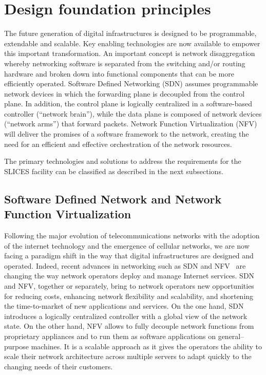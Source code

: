 \section{Design foundation principles}
\label{section:Design foundation principles}

The future generation of digital infrastructures is designed to be programmable, extendable and scalable. Key enabling technologies are now available to empower this important transformation. An important concept is network disaggregation whereby networking software is separated from the switching and/or routing hardware and broken down into functional components that can be more efficiently operated. Software Defined Networking (SDN) assumes programmable network devices in which the forwarding plane is decoupled from the control plane. In addition, the control plane is logically centralized in a software-based controller (“network brain”), while the data plane is composed of network devices (“network arms”) that forward packets. Network Function Virtualization (NFV) will deliver the promises of a software framework to the network, creating the need for an efficient and effective orchestration of the network resources. 

The primary technologies and solutions to address the requirements for the SLICES facility can be classified as described in the next subsections.

\subsection{Software Defined Network and Network Function Virtualization}

Following the major evolution of telecommunications networks with the adoption of the internet technology and the emergence of cellular networks, we are now facing a paradigm shift in the way that digital infrastructures are designed and operated. Indeed, recent advances in networking such as SDN and NFV~\cite{sdn-nfv-review} are changing the way network operators deploy and manage Internet services. SDN and NFV, together or separately, bring to network operators new opportunities for reducing costs, enhancing network flexibility and scalability, and shortening the time-to-market of new applications and services. On the one hand, SDN introduces a logically centralized controller with a global view of the network state. On the other hand, NFV allows to fully decouple network functions from proprietary appliances and to run them as software applications on general–purpose machines. It is a scalable approach as it gives the operators the ability to scale their network architecture across multiple servers to adapt quickly to the changing needs of their customers. 

